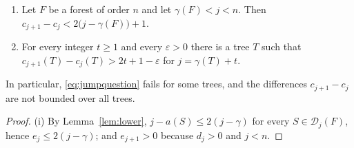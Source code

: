 \documentclass[smallextended,envcountsect,envcountsame]{svjour3}
\newcommand{\Dom}{\mathcal{D}}
\begin{document}
\begin{proposition}\label{prop:jumps}
\begin{enumerate}
\item[\textup{(i)}] Let $F$ be a forest of order $n$ and let
$\gamma(F)<j<n$. Then $c_{j+1}-c_j<2\bigl(j-\gamma(F)\bigr)+1$.
\item[\textup{(ii)}] For every integer $t\ge1$ and every $\varepsilon>0$ there
is a tree $T$ such that $c_{j+1}(T)-c_j(T)>2t+1-\varepsilon$ for
$j=\gamma(T)+t$.
\end{enumerate}
In particular, \eqref{eq:jumpquestion} fails for some trees, and the
differences $c_{j+1}-c_j$ are not bounded over all trees.
\end{proposition}

\begin{proof}
(i) By Lemma~\ref{lem:lower}, $j-a(S)\le2(j-\gamma)$ for every
$S\in\Dom_j(F)$, hence $e_j\le2(j-\gamma)$; and $e_{j+1}>0$ because $d_j>0$
and $j<n$.


\end{proof}
\end{document}
